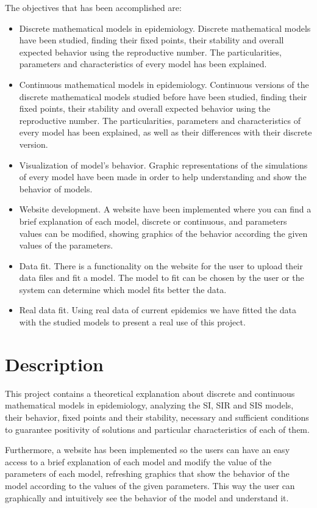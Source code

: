 The objectives that has been accomplished are:

\begin{itemize}
\item Discrete mathematical models in epidemiology. Discrete mathematical models  have been studied, finding their fixed points, their stability and overall expected behavior using the reproductive number. The particularities, parameters and characteristics of every model has been explained.
\item Continuous mathematical models in epidemiology. Continuous versions of the discrete mathematical models studied before have been studied, finding their fixed points, their stability and overall expected behavior using the reproductive number. The particularities, parameters and characteristics of every model has been explained, as well as their differences with their discrete version.
\item Visualization of model's behavior. Graphic representations of the simulations of every model have been made in order to help understanding and show the behavior of models.
\item Website development. A website have been implemented where you can find a brief explanation of each model, discrete or continuous, and parameters values can be modified, showing graphics of the behavior according the given values of the parameters.
\item Data fit. There is a functionality on the website for the user to upload their data files and fit a model. The model to fit can be chosen by the user or the system can determine which model fits better the data.
\item Real data fit. Using real data of current epidemics we have fitted the data with the studied models to present a real use of this project.
\end{itemize}

\section*{Description}

This project contains a theoretical explanation about discrete and continuous mathematical models in epidemiology, analyzing the SI, SIR and SIS models, their behavior, fixed points and their stability, necessary and sufficient conditions to guarantee positivity of solutions and particular characteristics of each of them. 

Furthermore, a website has been implemented so the users can have an easy access to a brief explanation of each model and modify the value of the parameters of each model, refreshing graphics that show the behavior of the model according to the values of the given parameters. This way the user can graphically and intuitively see the behavior of the model and understand it.

